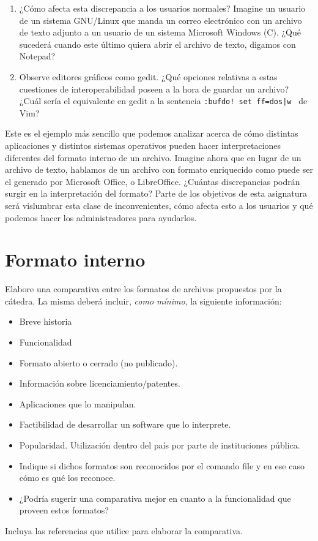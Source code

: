 \documentclass[12pt]{article}
\begin{document}
\begin{enumerate}
	\item ¿Cómo afecta esta discrepancia a los usuarios normales? Imagine un usuario de un 
	sistema GNU/Linux que manda un correo electrónico con un archivo de texto adjunto a un usuario de un 
	sistema Microsoft Windows (C). ¿Qué sucederá cuando este último quiera abrir el archivo 
	de texto, digamos con Notepad?
	\item Observe editores gráficos como gedit. ¿Qué opciones relativas a estas cuestiones de 
	interoperabilidad poseen a la hora de guardar un archivo? ¿Cuál sería el equivalente en  
	gedit a la sentencia {\tt :bufdo! set ff=dos|w } de Vim? 
\end{enumerate}
     
Este es el ejemplo más sencillo que podemos analizar acerca de cómo distintas aplicaciones y 
distintos sistemas operativos pueden hacer interpretaciones diferentes del formato interno de 
un archivo. Imagine ahora que en lugar de un archivo de texto, hablamos de un archivo con 
formato enriquecido como puede ser el generado por Microsoft Office, o LibreOffice. ¿Cuántas
discrepancias podrán surgir en la interpretación del formato? Parte de los objetivos de 
esta asignatura será vislumbrar esta clase de inconvenientes, cómo afecta esto a los usuarios y
qué podemos hacer los administradores para ayudarlos. 

\section*{Formato interno}

Elabore una comparativa entre los formatos de archivos propuestos por la 
cátedra. La misma deberá incluir, {\it como mínimo}, la siguiente información:
\begin{itemize} 
\item Breve historia
\item Funcionalidad
\item Formato abierto o cerrado (no publicado).
\item Información sobre licenciamiento/patentes.
\item Aplicaciones que lo manipulan. 
\item Factibilidad de desarrollar un software que lo interprete. 
\item Popularidad. Utilización dentro del país por parte de instituciones pública.  
\item Indique si dichos formatos son reconocidos por el comando file y en 
ese caso cómo es qué los reconoce.   
\item ¿Podría sugerir una comparativa mejor en cuanto a la funcionalidad que proveen estos formatos?
\end{itemize} 
Incluya las referencias que utilice para elaborar la comparativa. 
\end{document}
